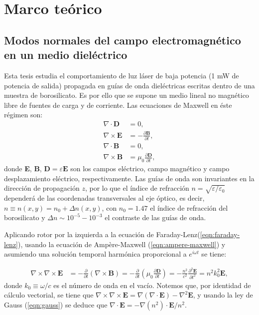 \chapter{Marco teórico}

\section{Modos normales del campo electromagnético en un medio dieléctrico}

Esta tesis estudia el comportamiento de luz láser de baja potencia (1 mW de potencia de salida) propagada en guías de onda dieléctricas escritas dentro de una muestra de borosilicato. Es por ello que se supone un medio lineal no magnético libre de fuentes de carga y de corriente. Las ecuaciones de Maxwell en éste régimen son:
\begin{align}
	\nabla\cdot\textbf{D} &= 0, \label{eqn:gauss}
	\\	
	\nabla\times\textbf{E} &= -\frac{\partial \textbf{B}}{\partial t}, \label{eqn:faraday-lenz}
	\\	
	\nabla\cdot\textbf{B} &= 0,
	\\	
	\nabla\times\textbf{B} &= \mu_0\frac{\partial \textbf{D}}{\partial t}, \label{eqn:ampere-maxwell}
\end{align}
donde \textbf{E}, \textbf{B}, $\textbf{D}=\varepsilon\textbf{E}$ son los campos eléctrico, campo magnético y campo desplazamiento eléctrico, respectivamente. Las guías de onda son invariantes en la dirección de propagación $z$, por lo que el índice de refracción $n=\sqrt{\varepsilon/\varepsilon_0}$ dependerá de las coordenadas transversales al eje óptico, es decir, $n \equiv n(x,y) = n_0 + \Delta n(x,y)$, con $n_0=1.47$ el índice de refracción del borosilicato y $\Delta n \sim 10^{-5}-10^{-3}$ el contraste de las guías de onda.

Aplicando rotor por la izquierda a la ecuación de Faraday-Lenz(\ref{eqn:faraday-lenz}), usando la ecuación de Ampère-Maxwell (\ref{eqn:ampere-maxwell}) y asumiendo una solución temporal harmónica proporcional a $e^{i\omega t}$ se tiene:

\begin{align}
	\nabla\times\nabla\times\textbf{E} &= -\frac{\partial}{\partial t}(\nabla\times\textbf{B}) = -\frac{\partial}{\partial t}\left(\mu_0\frac{\partial \textbf{D}}{\partial t}\right) = -\frac{n^2}{c^2}\frac{\partial^2 \textbf{E}}{\partial t^2} = n^2k_0^2 \textbf{E}, \label{eqn:rotordoble}
\end{align}
donde $k_0 \equiv \omega/c$ es el número de onda en el vacío. Notemos que, por identidad de cálculo vectorial, se tiene que $\nabla\times\nabla\times\textbf{E} = \nabla(\nabla\cdot\textbf{E}) - \nabla^2\textbf{E}$, y usando la ley de Gauss (\ref{eqn:gauss}) se deduce que $\nabla\cdot \textbf{E} = -\nabla(n^2)\cdot\textbf{E}/n^2$.

